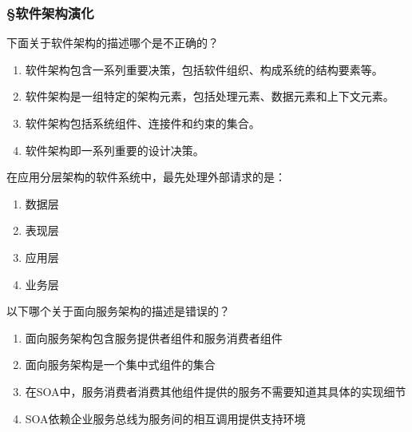 \subsubsection*{\S 软件架构演化}
\setcounter{problemname}{0}

\begin{problem}
	下面关于软件架构的描述哪个是不正确的？
        \begin{enumerate}[label=\Alph*.]
            \item 软件架构包含一系列重要决策，包括软件组织、构成系统的结构要素等。
            \item 软件架构是一组特定的架构元素，包括处理元素、数据元素和上下文元素。
            \item 软件架构包括系统组件、连接件和约束的集合。
            \item 软件架构即一系列重要的设计决策。
        \end{enumerate}
\end{problem}



\begin{problem}
	在应用分层架构的软件系统中，最先处理外部请求的是：
    \vspace{-0.8em}
    \begin{multicols}{4}
        \begin{enumerate}[label=\Alph*.]
            \item 数据层
            \item 表现层
            \item 应用层
            \item 业务层
        \end{enumerate}
    \end{multicols}
    \vspace{-1em}
\end{problem}



\begin{problem}
	以下哪个关于面向服务架构的描述是错误的？
        \begin{enumerate}[label=\Alph*.]
            \item 面向服务架构包含服务提供者组件和服务消费者组件
            \item 面向服务架构是一个集中式组件的集合
            \item 在SOA中，服务消费者消费其他组件提供的服务不需要知道其具体的实现细节
            \item SOA依赖企业服务总线为服务间的相互调用提供支持环境
        \end{enumerate}
\end{problem}




